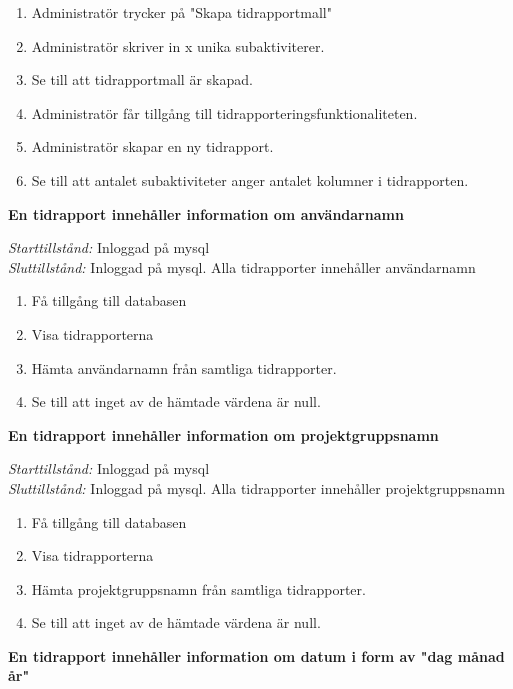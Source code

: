 \documentclass[a4paper]{article}
\begin{document}
\begin{FT}
\begin{enumerate}
\item Administratör trycker på "Skapa tidrapportmall"
\item Administratör skriver in x unika subaktiviterer.
\item Se till att tidrapportmall är skapad.
\item Administratör får tillgång till tidrapporteringsfunktionaliteten.
\item Administratör skapar en ny tidrapport.
\item Se till att antalet subaktiviteter anger antalet kolumner i tidrapporten.
\end{enumerate}

\item
\textbf{En tidrapport innehåller information om användarnamn}

\emph{Starttillstånd:} Inloggad på mysql\\
\emph{Sluttillstånd:} Inloggad på mysql. Alla tidrapporter innehåller användarnamn\\

\begin{enumerate}
\item Få tillgång till databasen
\item Visa tidrapporterna
\item Hämta användarnamn från samtliga tidrapporter.
\item Se till att inget av de hämtade värdena är null.
\end{enumerate}

\item
\textbf{En tidrapport innehåller information om projektgruppsnamn}

\emph{Starttillstånd:} Inloggad på mysql\\
\emph{Sluttillstånd:} Inloggad på mysql. Alla tidrapporter innehåller projektgruppsnamn\\

\begin{enumerate}
\item Få tillgång till databasen
\item Visa tidrapporterna
\item Hämta projektgruppsnamn från samtliga tidrapporter.
\item Se till att inget av de hämtade värdena är null.
\end{enumerate}



\item
\textbf{En tidrapport innehåller information om datum i form av "dag månad år"}


\end{FT}
\end{document}
